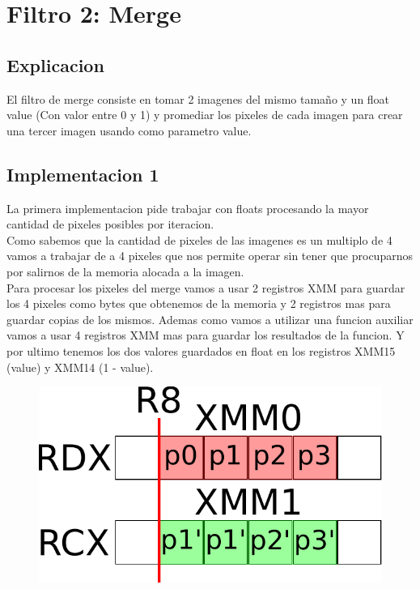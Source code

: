 \section{Filtro 2: Merge}

\subsection{Explicacion}
El filtro de merge consiste en tomar 2 imagenes del mismo tamaño y un float value (Con valor entre 0 y 1) y promediar los pixeles de cada imagen para crear una tercer imagen usando como parametro value. \\

\subsection{Implementacion 1}
La primera implementacion pide trabajar con floats procesando la mayor cantidad de pixeles posibles por iteracion. \\

Como sabemos que la cantidad de pixeles de las imagenes es un multiplo de 4 vamos a trabajar de a 4 pixeles que nos permite operar sin tener que procuparnos por salirnos de la memoria alocada a la imagen. \\

Para procesar los pixeles del merge vamos a usar 2 registros XMM para guardar los 4 pixeles como bytes que obtenemos de la memoria y 2 registros mas para guardar copias de los mismos. Ademas como vamos a utilizar una funcion auxiliar vamos a usar 4 registros XMM mas para guardar los resultados de la funcion. Y por ultimo tenemos los dos valores guardados en float en los registros XMM15 (value) y XMM14 (1 - value). \\

\begin{figure}[h!]
	\centering
	\includegraphics[scale=0.5]{images/MergeASM1_0}
\end{figure}

